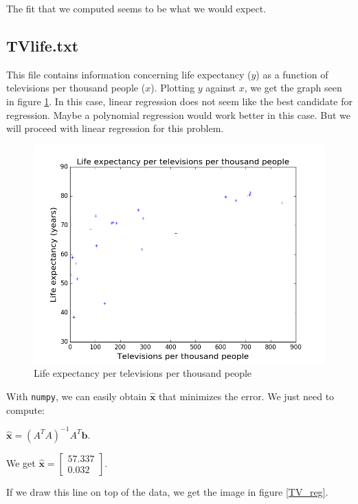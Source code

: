 \documentclass[]{article}
\begin{document}
The fit that we computed seems to be what we would expect.

\newpage
\subsection*{TVlife.txt}
This file contains information concerning life expectancy ($y$) as a function of televisions per thousand people ($x$). Plotting $y$ against $x$, we get the graph seen in figure \ref{TV_plain}. In this case, linear regression does not seem like the best candidate for regression. Maybe a polynomial regression would work better in this case. But we will proceed with linear regression for this problem.

\begin{figure}[h]
\centering
\includegraphics{TV_plain.png}
\caption{Life expectancy per televisions per thousand people}
\label{TV_plain}
\end{figure}

With \texttt{numpy}, we can easily obtain $\widehat{\textbf{x}}$ that minimizes the error. We just need to compute:

$\widehat{\textbf{x}} = (A^TA)^{-1}A^T\textbf{b}$.

We get $\widehat{\textbf{x}} = \left[\begin{smallmatrix}57.337\\0.032\end{smallmatrix}\right]$.

If we draw this line on top of the data, we get the image in figure \ref{TV_reg}.
\end{document}
